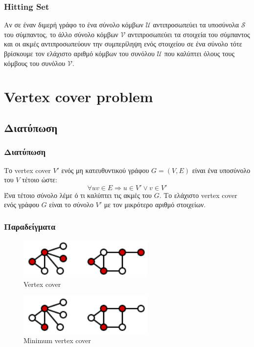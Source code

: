 \documentclass[greek]{beamer}
\begin{document}

\begin{frame}
\frametitle{Hitting Set}
Αν σε έναν διμερή γράφο το ένα σύνολο κόμβων ${\mathcal{U}}$ αντιπροσωπεύει τα υποσύνολα ${\mathcal{S}}$ του σύμπαντος, το άλλο σύνολο κόμβων ${\mathcal{V}}$ αντιπροσωπεύει τα στοιχεία του σύμπαντος και οι ακμές αντιπροσωπεύουν την συμπερίληψη ενός στοιχείου σε ένα σύνολο τότε βρίσκουμε τον ελάχιστο αριθμό κόμβων του συνόλου ${\mathcal{U}}$ που καλύπτει όλους τους κόμβους του συνόλου ${\mathcal{V}}$.
\end{frame}


\section{Vertex cover problem}


\subsection{Διατύπωση}


\begin{frame}
\frametitle{Διατύπωση}
Το vertex cover $V'$ ενός μη κατευθυντικού γράφου $G=(V,E)$ είναι ένα υποσύνολο του $V$ τέτοιο ώστε:
$$\forall uv \in{E} \Rightarrow u \in{V'} \lor v \in{V'}$$
Ένα τέτοιο σύνολο λέμε ό τι καλύπτει τις ακμές του $G$. Το ελάχιστο vertex cover ενός γράφου $G$ είναι το σύνολο $V'$ με τον μικρότερο αριθμό στοιχείων.
\end{frame}


\begin{frame}
\frametitle{Παραδείγματα}
\begin{figure}[H]
\caption{Vertex cover}
\centering
\includegraphics[width=0.6\textwidth]{Figures/vert_cover.png}\centering
\end{figure}

\begin{figure}[H]
\caption{Minimum vertex cover}
\centering
\includegraphics[width=0.6\textwidth]{Figures/min_vert_cover.png}\centering
\end{figure}
\end{frame}
\end{document}
